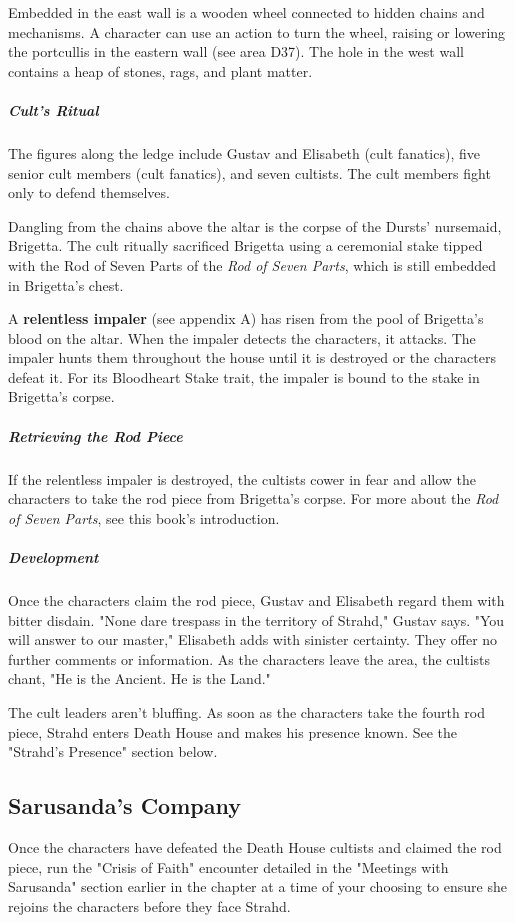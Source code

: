 \documentclass[10pt,a4paper,twoside,bg=print,twocolumn,openany,nodeprecatedcode]{dndbook}
\begin{document}
Embedded in the east wall is a wooden wheel connected to hidden chains and mechanisms. A character can use an action to turn the wheel, raising or lowering the portcullis in the eastern wall (see area D37). The hole in the west wall contains a heap of stones, rags, and plant matter.

\subparagraph{Cult's Ritual}
The figures along the ledge include Gustav and Elisabeth (cult fanatics), five senior cult members (cult fanatics), and seven cultists. The cult members fight only to defend themselves.

Dangling from the chains above the altar is the corpse of the Dursts' nursemaid, Brigetta. The cult ritually sacrificed Brigetta using a ceremonial stake tipped with the Rod of Seven Parts of the \textit{Rod of Seven Parts}, which is still embedded in Brigetta's chest.

A \textbf{relentless impaler} (see appendix A) has risen from the pool of Brigetta's blood on the altar. When the impaler detects the characters, it attacks. The impaler hunts them throughout the house until it is destroyed or the characters defeat it. For its Bloodheart Stake trait, the impaler is bound to the stake in Brigetta's corpse.

\subparagraph{Retrieving the Rod Piece}
If the relentless impaler is destroyed, the cultists cower in fear and allow the characters to take the rod piece from Brigetta's corpse. For more about the \textit{Rod of Seven Parts}, see this book's introduction.

\subparagraph{Development}
Once the characters claim the rod piece, Gustav and Elisabeth regard them with bitter disdain. "None dare trespass in the territory of Strahd," Gustav says. "You will answer to our master," Elisabeth adds with sinister certainty. They offer no further comments or information. As the characters leave the area, the cultists chant, "He is the Ancient. He is the Land."

The cult leaders aren't bluffing. As soon as the characters take the fourth rod piece, Strahd enters Death House and makes his presence known. See the "Strahd's Presence" section below.

\subsection{Sarusanda's Company}
Once the characters have defeated the Death House cultists and claimed the rod piece, run the "Crisis of Faith" encounter detailed in the "Meetings with Sarusanda" section earlier in the chapter at a time of your choosing to ensure she rejoins the characters before they face Strahd.
\end{document}

